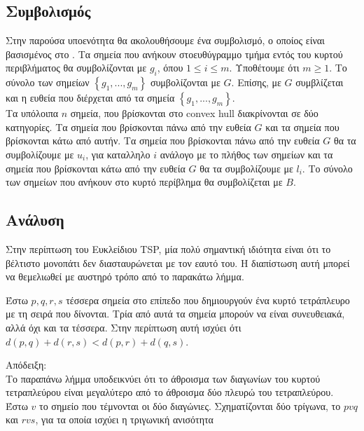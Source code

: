 \documentclass[oneside,12pt]{book}
\theoremstyle{definition}
\begin{document}
\subsection{Συμβολισμός}

Στην παρούσα υποενότητα θα ακολουθήσουμε ένα συμβολισμό, ο οποίος είναι βασισμένος στο \cite{17}. Τα σημεία που ανήκουν στοευθύγραμμο τμήμα εντός του κυρτού περιβλήματος θα συμβολίζονται με \(g_i\), όπου \(1 \leq i \leq m\). Υποθέτουμε ότι \(m \geq 1\). Το σύνολο των σημείων \(\left\{g_1,...,g_m\right\}\) συμβολίζονται με \(G\). Επίσης, με \(G\) συμβλίζεται και η ευθεία που διέρχεται από τα σημεία \(\left\{g_1,...,g_m\right\}\). \\

Τα υπόλοιπα \(n\) σημεία, που βρίσκονται στο convex hull διακρίνονται σε δύο κατηγορίες. Τα σημεία που βρίσκονται πάνω από την ευθεία \(G\) και τα σημεία που βρίσκονται κάτω από αυτήν. Τα σημεία που βρίσκονται πάνω από την ευθεία \(G\) θα τα συμβολίζουμε με \(u_i\), για καταλληλο \(i\) ανάλογο με το πλήθος των σημείων και τα σημεία που βρίσκονται κάτω από την ευθεία \(G\) θα τα συμβολίζουμε με \(l_i\). Το σύνολο των σημείων που ανήκουν στο κυρτό περίβλημα θα συμβολίζεται με \(B\). \\

\subsection{Ανάλυση}

Στην περίπτωση του Ευκλείδιου TSP, μία πολύ σημαντική ιδιότητα είναι ότι το βέλτιστο μονοπάτι δεν διασταυρώνεται με τον εαυτό του. Η διαπίστωση αυτή μπορεί να θεμελιωθεί με αυστηρό τρόπο από το παρακάτω λήμμα. \\

\begin{mylemma}{}{}
	Έστω \(p,q,r,s\) τέσσερα σημεία στο επίπεδο που δημιουργούν ένα κυρτό τετράπλευρο με τη σειρά που δίνονται. Τρία από αυτά τα σημεία μπορούν να είναι συνευθειακά, αλλά όχι και τα τέσσερα. Στην περίπτωση αυτή ισχύει ότι
	\(d(p,q) + d(r,s) < d(p,r) + d(q,s)\).
\end{mylemma}

Απόδειξη: \\
Το παραπάνω λήμμα υποδεικνύει ότι το άθροισμα των διαγωνίων του κυρτού τετραπλεύρου είναι μεγαλύτερο από το άθροισμα δύο πλευρώ του τετραπλεύρου. \\
Έστω \(v\) το σημείο που τέμνονται οι δύο διαγώνιες. Σχηματίζονται δύο τρίγωνα, το \(pvq\) και \(rvs\), για τα οποία ισχύει η τριγωνική ανισότητα
\end{document}
